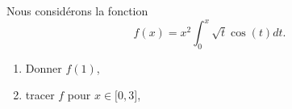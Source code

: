 \begin{exercice}\label{exotestMAT1151-G310003}

	Nous considérons la fonction
	\begin{equation}
		f(x)=x^2\int_0^x\sqrt{t}\cos(t)dt.
	\end{equation}
	\begin{enumerate}

		\item
			Donner $f(1)$,
		\item
			tracer $f$ pour $x\in\mathopen[ 0 , 3 \mathclose]$,
	\end{enumerate}

\end{exercice}
